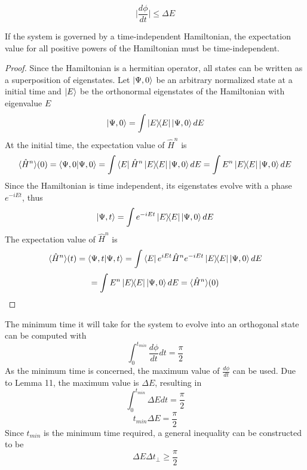 \begin{sol}
\begin{enumerate}[label=\textbf{(\alph*)}]
\begin{equation}
	\bigg|\frac{d\phi}{dt}\bigg|\leq \Delta E
\end{equation}
\begin{lemma}
If the system is governed by a time-independent Hamiltonian, the expectation value for all positive powers of the Hamiltonian must be time-independent.
\end{lemma}
\begin{proof}
Since the Hamiltonian is a hermitian operator, all states can be written as a superposition of eigenstates. Let $\ket{\Psi,0}$ be an arbitrary normalized state at a initial time and $\ket{E}$ be the orthonormal eigenstates of the Hamiltonian with eigenvalue $E$
\begin{equation}
	\ket{\Psi,0}=\int\ketbra{E}{E}\ket{\Psi,0} dE
\end{equation}
At the initial time, the expectation value of $\hat H^n$ is
\begin{equation}
	\langle \hat H^n\rangle(0)=\braket{\Psi,0}{\Psi,0}=\int\bra{E}\hat H^n\ketbra{E}{E}\ket{\Psi,0}dE=\int E^n\ketbra{E}{E}\ket{\Psi,0}dE
\end{equation}
Since the Hamiltonian is time independent, its eigenstates evolve with a phase $e^{-iEt}$, thus
\begin{equation}
	\ket{\Psi,t}=\int e^{-iEt}\ketbra{E}{E}\ket{\Psi,0} dE
\end{equation}
The expectation value of $\hat H^n$ is
\begin{equation}
	\langle \hat H^n\rangle(t)=\braket{\Psi,t}{\Psi,t}=\int\bra{E}e^{iEt}\hat H^ne^{-iEt}\ketbra{E}{E}\ket{\Psi,0}dE
\end{equation}\begin{equation}
	=\int E^n\ketbra{E}{E}\ket{\Psi,0}dE=\langle \hat H^n\rangle(0)
\end{equation}
\end{proof}
The minimum time it will take for the system to evolve into an orthogonal state can be computed with
\begin{equation}
	\int_0^{t_{min}}\frac{d\phi}{dt}dt=\frac{\pi}{2}
\end{equation}
As the minimum time is concerned, the maximum value of $\frac{d\phi}{dt}$ can be used. Due to Lemma 11, the maximum value is $\Delta E$, resulting in
\begin{equation}
	\int_0^{t_{min}}\Delta Edt=\frac{\pi}{2}
\end{equation}
\begin{equation}
	t_{min}\Delta E=\frac{\pi}{2}
\end{equation}
Since $t_{min}$ is the minimum time required, a general inequality can be constructed to be
\begin{equation}
	\Delta E\Delta t_\perp\geq\frac{\pi}{2}
\end{equation}


\end{enumerate}
\end{sol}

